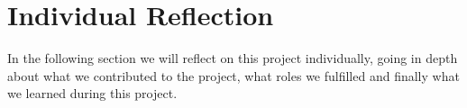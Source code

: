 \newpage
\section{Individual Reflection}
In the following section we will reflect on this project individually, going in depth about what we contributed to the project, what roles we fulfilled and finally what we learned during this project.





